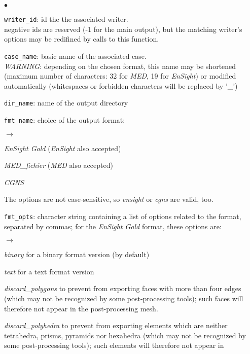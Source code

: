 {{{\begin{list}{$\bullet$}{}
       \item \texttt{writer\_id}: id the the associated writer.\\
             negative ids are reserved (-1 for the main output),
             but the matching writer's options may be redifined by
             calls to this function.
       \item \texttt{case\_name}: basic name of the associated case.\\ {\em
             WARNING}: depending on the chosen format, this name may
             be shortened (maximum number of characters: 32 for {\em MED},
             19 for {\em EnSight}) or modified automatically (whitespaces or
             forbidden characters will be replaced by '\_')
       \item \texttt{dir\_name}: name of the output directory
       \item \texttt{fmt\_name}: choice of the output format:
        \begin{list}{$\rightarrow$}{}
               \item {\em EnSight Gold} ({\em EnSight} also accepted)
               \item {\em MED\_fichier} ({\em MED} also accepted)
               \item {\em CGNS}
         \end{list}
The options are not case-sensitive, so {\em ensight} or {\em cgns} are valid, too.
       \item \texttt{fmt\_opts}: character string containing a list of
             options related to the format, separated by commas; for the
             {\em EnSight Gold} format, these options are:
        \begin{list}{$\rightarrow$}{}
               \item {\em binary} for a binary format version (by default)
               \item {\em text} for a text format version
               \item {\em discard\_polygons} to prevent from exporting faces with more
 than four edges (which may not be recognized by some post-processing tools); such
 faces will therefore not appear in the post-processing mesh.
               \item {\em discard\_polyhedra} to prevent from exporting elements which
 are neither tetrahedra, prisms, pyramids nor hexahedra (which may not be recognized by
 some post-processing tools); such elements will therefore not appear in

\end{list}
\end{list}}}}
